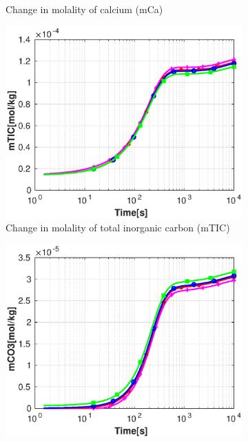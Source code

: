 \begin{figure}[!h]
\begin{subfigure}{.5\linewidth}
        \caption{\small Change in molality of calcium (mCa)}
        \label{fig:withoutpHmCa}
    \end{subfigure}%
    \hfill
    \begin{subfigure}{.5\linewidth}
            \centering
        \includegraphics[width=\textwidth]{PICTURES/without_pH_mTIC.eps}
        \caption{\small Change in molality of total inorganic carbon (mTIC)}
        \label{fig:withoutpHmTIC}
    \end{subfigure}%
    \hfill
    \begin{subfigure}{.5\linewidth}
            \centering
        \includegraphics[width=\textwidth]{PICTURES/without_pH_mCO3.eps}

\end{subfigure}
\end{figure}
